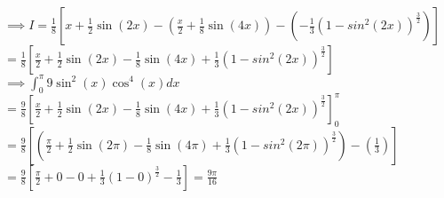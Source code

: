 \documentclass{article}
\begin{document}
{    $ \implies I 
    = \frac{1}{8}\left[
        x 
        + \frac{1}{2}\sin(2x)
        - (\frac{x}{2} + \frac{1}{8}\sin(4x))
        - (-\frac{1}{3}(1-sin^2(2x))^{\frac{3}{2}})
    \right] $\\

    $ 
    = \frac{1}{8}\left[
        \frac{x}{2}
        + \frac{1}{2}\sin(2x)
        - \frac{1}{8}\sin(4x)
        +\frac{1}{3}(1-sin^2(2x))^{\frac{3}{2}}
    \right] $\\

    $ \implies \int_{0}^{\pi}{9\sin^2(x)\cos^4(x)}dx $\\

    $
    = \frac{9}{8}\left[
        \frac{x}{2}
        + \frac{1}{2}\sin(2x)
        - \frac{1}{8}\sin(4x)
        +\frac{1}{3}(1-sin^2(2x))^{\frac{3}{2}}
    \right]_{0}^{\pi} $\\

    $
    = \frac{9}{8}\left[
        (
            \frac{\pi}{2}
            + \frac{1}{2}\sin(2\pi)
            - \frac{1}{8}\sin(4\pi)
            +\frac{1}{3}(1-sin^2(2\pi))^{\frac{3}{2}}
        )
        -
        (\frac{1}{3})
    \right] $\\

    $ = \frac{9}{8}\left[
        \frac{\pi}{2} + 0 - 0
        + \frac{1}{3}(1-0)^{\frac{3}{2}}
        - \frac{1}{3}
    \right] = \frac{9\pi}{16} $\\
}
\end{document}
